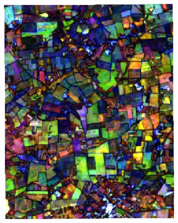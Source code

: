 \documentclass[journal,article,submit,pdftex,moreauthors]{Definitions/mdpi}
\begin{document}
\begin{figure}[H]
\begin{subfigure}[t]{0.23\linewidth}
    \caption{}
	\label{fig:color_map_f}
	\end{subfigure}
    \begin{subfigure}[t]{0.23\linewidth}
		\centering
	\includegraphics[width=0.95\linewidth]{figures/aes_1_layer_mse_results/composites/composite_image_514283.pdf}
    \caption{}
	\label{fig:color_map_g}
	\end{subfigure}
    \begin{subfigure}[t]{0.23\linewidth}
		\centering

\end{subfigure}
\end{figure}
\end{document}
